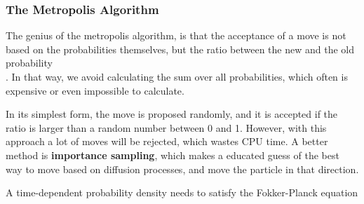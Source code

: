 \subsubsection{The Metropolis Algorithm}
The genius of the metropolis algorithm, is that the acceptance of a move is not based on the probabilities themselves, but the ratio between the new and the old probability\\
. In that way, we avoid calculating the sum over all probabilities, which often is expensive or even impossible to calculate. 

In its simplest form, the move is proposed randomly, and it is accepted if the ratio is larger than a random number between 0 and 1. However, with this approach a lot of moves will be rejected, which wastes CPU time. A better method is \textbf{importance sampling}, which makes a educated guess of the best way to move based on diffusion processes, and move the particle in that direction. 

A time-dependent probability density needs to satisfy the Fokker-Planck equation 